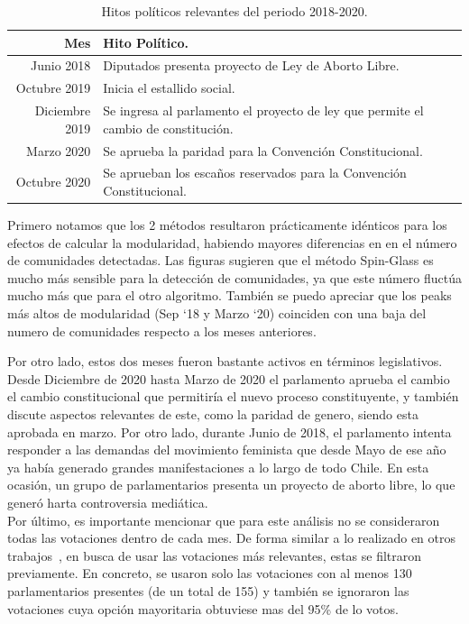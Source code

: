 \documentclass{proyectotesis}
\begin{document}
\begin{table}[ht!]
    \centering
    \caption{Hitos políticos relevantes del periodo 2018-2020.}
    \label{hp} 
    \vspace{3mm}
    \begin{tabular}{r|l}
    Mes & Hito Político.\\
    \hline
    Junio 2018 & Diputados presenta proyecto de Ley de Aborto Libre.\\
    Octubre 2019 & Inicia el estallido social.\\
    Diciembre 2019 & Se ingresa al parlamento el proyecto de ley que permite el cambio de constitución.\\
    Marzo 2020 & Se aprueba la paridad para la Convención Constitucional.\\
    Octubre 2020 & Se aprueban los escaños reservados para la Convención Constitucional.
    \end{tabular}
\end{table}


Primero notamos que los 2 métodos resultaron prácticamente idénticos para los efectos de calcular la modularidad, habiendo mayores diferencias en en el número de comunidades detectadas. Las figuras sugieren que el método Spin-Glass es mucho más sensible para la detección de comunidades, ya que este número fluctúa mucho más que para el otro algoritmo. También se puedo apreciar que los peaks más altos de modularidad (Sep `18 y Marzo `20) coinciden con una baja del numero de comunidades respecto a los meses anteriores.

Por otro lado, estos dos meses fueron bastante activos en términos legislativos. Desde Diciembre de 2020 hasta Marzo de 2020 el parlamento aprueba el cambio el cambio constitucional que permitiría el nuevo proceso constituyente, y también discute aspectos relevantes de este, como la paridad de genero, siendo esta aprobada en marzo. Por otro lado, durante Junio de 2018, el parlamento intenta responder a las demandas del movimiento feminista que desde Mayo de ese año ya había generado grandes manifestaciones a lo largo de todo Chile. En esta ocasión, un grupo de parlamentarios presenta un proyecto de aborto libre, lo que generó harta controversia mediática.\\

Por último, es importante mencionar que para este análisis no se consideraron todas las votaciones dentro de cada mes. De forma similar a lo realizado en otros trabajos~\cite{andris_rise_2015, schoch_legislators_2020}, en busca de usar las votaciones más relevantes, estas se filtraron previamente. En concreto, se usaron solo las votaciones con al menos 130 parlamentarios presentes (de un total de 155) y también se ignoraron las votaciones cuya opción mayoritaria obtuviese mas del 95\% de lo votos.
\end{document}
